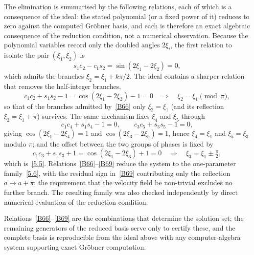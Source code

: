 \documentclass[11pt]{jfm}
\numberwithin{equation}{section}
\begin{document}
The elimination is summarised by the following relations, each of which is a consequence of the
ideal: the stated polynomial (or a fixed power of it) reduces to zero against the computed
Gr\"obner basis, and each is therefore an exact algebraic consequence of the reduction
condition, not a numerical observation. Because the polynomial variables record only the doubled
angles $2\xi_i$, the first relation to isolate the pair $(\xi_1,\xi_2)$ is
\begin{equation}
\label{B66}
s_1c_2-c_1s_2=\sin(2\xi_1-2\xi_2)=0,
\end{equation}
which admits the branches $\xi_2=\xi_1+k\pi/2$. The ideal contains a sharper relation that
removes the half-integer branches,
\begin{equation}
\label{B67}
c_1c_2+s_1s_2-1=\cos(2\xi_1-2\xi_2)-1=0
\quad\Longrightarrow\quad \xi_2=\xi_1 \pmod{\pi},
\end{equation}
so that of the branches admitted by~\eqref{B66} only $\xi_2=\xi_1$ (and its reflection
$\xi_2=\xi_1+\pi$) survives. The same mechanism fixes $\xi_4$ and $\xi_5$ through
\begin{equation}
\label{B68}
c_1c_4+s_1s_4-1=0,\qquad c_3c_5+s_3s_5-1=0,
\end{equation}
giving $\cos(2\xi_1-2\xi_4)=1$ and $\cos(2\xi_3-2\xi_5)=1$, hence $\xi_4=\xi_1$ and
$\xi_5=\xi_3$ modulo $\pi$; and the offset between the two groups of phases is fixed by
\begin{equation}
\label{B69}
c_1c_3+s_1s_3+1=\cos(2\xi_1-2\xi_3)+1=0
\quad\Longrightarrow\quad \xi_3=\xi_1\pm\tfrac{\pi}{2},
\end{equation}
which is~\eqref{5.5}. Relations~\eqref{B66}--\eqref{B69} reduce the system to the one-parameter
family~\eqref{5.6}, with the residual sign in~\eqref{B69} contributing only the reflection
$a\mapsto a+\pi$; the requirement that the velocity field be non-trivial excludes no further
branch. The resulting family was also checked independently by direct numerical evaluation of
the reduction condition.

Relations~\eqref{B66}--\eqref{B69} are the combinations that determine the solution set; the
remaining generators of the reduced basis serve only to certify these, and the complete basis is
reproducible from the ideal above with any computer-algebra system supporting exact Gr\"obner
computation.
\end{document}
